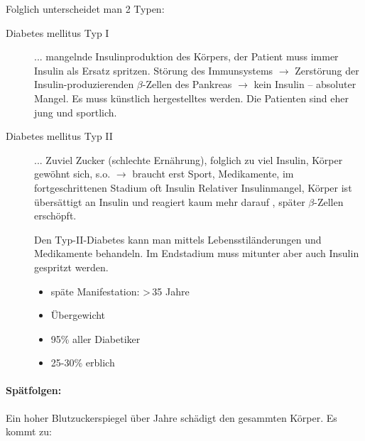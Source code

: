 Folglich unterscheidet man 2 Typen:

\begin{description}
    \item[Diabetes mellitus Typ I]   ... mangelnde Insulinproduktion des
    Körpers, der Patient muss immer Insulin als Ersatz spritzen.
    Störung des Immunsystems ${\rightarrow}$ Zerstörung der
    Insulin-produzierenden ${\beta}$-Zellen des Pankreas ${\rightarrow}$
    kein Insulin -- absoluter Mangel. Es muss
    künstlich hergestelltes  werden.
    Die Patienten sind eher jung und sportlich.
    
    \item[Diabetes mellitus Typ II]
     ... Zuviel Zucker
    (schlechte Ernährung), folglich zu viel Insulin, Körper gewöhnt
    sich, s.o. ${\rightarrow}$ braucht erst Sport, Medikamente, im
    fort\-ge\-schrittenen Stadium oft Insulin
    Relativer Insulinmangel, Körper ist übersättigt an
    Insulin und reagiert kaum mehr darauf ,
    später ${\beta}$-Zellen erschöpft. 
    
    Den Typ-II-Diabetes kann man mittels
    Lebensstiländerungen und Medikamente behandeln. Im
    Endstadium muss mitunter aber auch Insulin gespritzt
    werden.
    
    \begin{itemize}
        \item späte Manifestation: {\textgreater}\,35 Jahre
        \item Übergewicht
        \item 95\% aller Diabetiker
        \item 25-30\% erblich
    \end{itemize}
    
\end{description}

\paragraph*{Spätfolgen:}

Ein hoher Blutzuckerspiegel über Jahre schädigt den gesammten
Körper. Es kommt zu:

